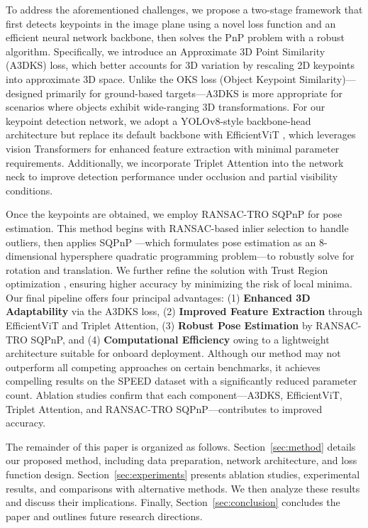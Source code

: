 \documentclass[a4paper,fleqn]{cas-sc}
\begin{document}
To address the aforementioned challenges, we propose a two-stage framework that first detects keypoints in the image plane using a novel loss function and an efficient neural network backbone, then solves the PnP problem with a robust algorithm. Specifically, we introduce an Approximate 3D Point Similarity (A3DKS) loss, which better accounts for 3D variation by rescaling 2D keypoints into approximate 3D space. Unlike the OKS loss (Object Keypoint Similarity)—designed primarily for ground-based targets—A3DKS is more appropriate for scenarios where objects exhibit wide-ranging 3D transformations. For our keypoint detection network, we adopt a YOLOv8-style backbone-head architecture but replace its default backbone with EfficientViT \citep{liu2023efficientvit}, which leverages vision Transformers for enhanced feature extraction with minimal parameter requirements. Additionally, we incorporate Triplet Attention \citep{triplet} into the network neck to improve detection performance under occlusion and partial visibility conditions.

Once the keypoints are obtained, we employ RANSAC-TRO SQPnP for pose estimation. This method begins with RANSAC-based inlier selection to handle outliers, then applies SQPnP \citep{terzakis2020consistently}—which formulates pose estimation as an 8-dimensional hypersphere quadratic programming problem—to robustly solve for rotation and translation. We further refine the solution with Trust Region optimization \citep{trf}, ensuring higher accuracy by minimizing the risk of local minima. Our final pipeline offers four principal advantages: (1) \textbf{Enhanced 3D Adaptability} via the A3DKS loss, (2) \textbf{Improved Feature Extraction} through EfficientViT and Triplet Attention, (3) \textbf{Robust Pose Estimation} by RANSAC-TRO SQPnP, and (4) \textbf{Computational Efficiency} owing to a lightweight architecture suitable for onboard deployment. Although our method may not outperform all competing approaches on certain benchmarks, it achieves compelling results on the SPEED dataset with a significantly reduced parameter count. Ablation studies confirm that each component—A3DKS, EfficientViT, Triplet Attention, and RANSAC-TRO SQPnP—contributes to improved accuracy.

The remainder of this paper is organized as follows. Section~\ref{sec:method} details our proposed method, including data preparation, network architecture, and loss function design. Section~\ref{sec:experiments} presents ablation studies, experimental results, and comparisons with alternative methods. We then analyze these results and discuss their implications. Finally, Section~\ref{sec:conclusion} concludes the paper and outlines future research directions.
\end{document}
